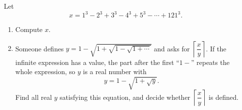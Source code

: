 Let
\[x=1^3-2^3+3^3-4^3+5^3-\cdots+121^3.\]
\begin{enumerate}
\item[(a)] Compute $x$.
\item[(b)] Someone defines $y=1-\sqrt{1+\sqrt{1-\sqrt{1+\cdots}}}$ and asks for $\left\lceil\dfrac xy\right\rceil$. If the infinite expression has a value, the part after the first ``$1-$'' repeats the whole expression, so $y$ is a real number with
\[y=1-\sqrt{1+\sqrt y}.\]
Find all real $y$ satisfying this equation, and decide whether $\left\lceil\dfrac xy\right\rceil$ is defined.
\end{enumerate}

